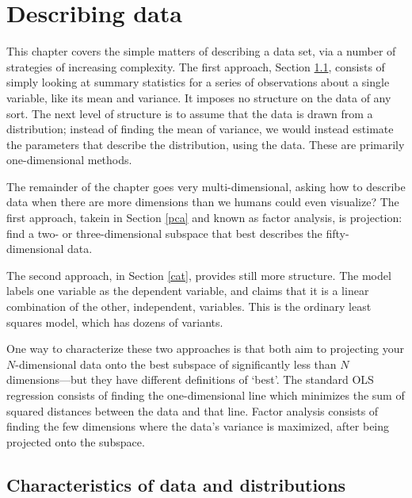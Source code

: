 \chapter{Describing data} \label{projections}
\def\xv{{\bf x} } \def\yv{{\bf y} } \def\pv{{\bf p} }
\def\Iv{{\bf I}}\def\Sv{{\bf S}}\def\yv{{\bf y}}\def\Zv{{\bf Z}} \def\cv{{\bf c}} \def\uv{{\bf u}} \def\Yv{{\bf Y}} \def\Xv{{\bf X}} \def\Qv{{\bf Q}}
\def\betav{{\mbox{\boldmath$\beta$}}}
\def\vector#1{\left[\matrix{#1}\right]}

This chapter covers the simple matters of describing a data set, via a
number of strategies of increasing complexity. 
The first approach, Section \ref{basicstats}, consists of simply looking
at summary statistics for a series of observations about a single
variable, like its mean and variance. It imposes no structure on the
data of any sort. The next level of structure is to
assume that the data is drawn from a distribution; instead of finding
the mean of variance, we would instead estimate the parameters that
describe the distribution, using the data. These are primarily
one-dimensional methods.

The remainder of the chapter goes very multi-dimensional, asking how
to describe data when there are more dimensions than we humans could
even visualize?  The first approach, takein in Section \ref{pca} and
known as factor analysis,
is projection: find a two- or three-dimensional subspace that best
describes the fifty-dimensional data. 

The second approach, in Section \ref{cat}, provides still more
structure. The model labels one variable as the dependent variable, and claims
that it is a linear combination of the other, independent, variables.
This is the ordinary least squares model, which has dozens of variants.

One way to characterize these two approaches is that both aim to projecting your
$N$-dimensional data onto the best subspace of significantly less than
$N$ dimensions---but they have different definitions of `best'.
The standard OLS regression consists of
finding the one-dimensional line which minimizes the sum of squared
distances between the data and that line. Factor analysis consists
of finding the few dimensions where the data's variance is maximized, after being
projected onto the subspace.



\section{Characteristics of data and distributions}\label{basicstats}

